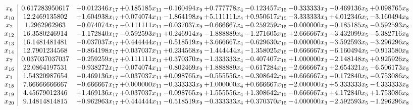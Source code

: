 \documentclass[10pt]{article}
\begin{document}
 \[\begin{array}{c| c c@{\hskip 2pt} c@{\hskip 2pt} c@{\hskip 2pt} c@{\hskip 2pt} c@{\hskip 2pt} c@{\hskip 2pt} c@{\hskip 2pt} c@{\hskip 2pt} }
 x_{6}   &  0.617283950617 & + 0.012346 x_{17} & + 0.185185 x_{11} & -0.160494 x_{9} & + 0.777778 x_{4} & -0.123457 x_{15} & -0.333333 x_{3} & -0.469136 x_{5} & + 0.098765 x_{8}\\
 x_{10}   &  12.2469135802 & + 1.604938 x_{17} & + 0.074074 x_{11} & -1.864198 x_{9} & + 5.111111 x_{4} & + 0.950617 x_{15} & -3.333333 x_{3} & + 4.012346 x_{5} & -3.160494 x_{8}\\
 x_{2}   &  1.2962962963 & -0.074074 x_{17} & -0.111111 x_{11} & -0.037037 x_{9} & -0.666667 x_{4} & -0.259259 x_{15} & -0.000000 x_{3} & -0.185185 x_{5} & -0.592593 x_{8}\\
 x_{12}   &  16.3580246914 & -1.172840 x_{17} & -0.592593 x_{11} & + 0.246914 x_{9} & -1.888889 x_{4} & -1.271605 x_{15} & + 2.666667 x_{3} & -3.432099 x_{5} & -5.382716 x_{8}\\
 x_{13}   &  16.1481481481 & -0.037037 x_{17} & + 0.444444 x_{11} & -0.518519 x_{9} & + 3.666667 x_{4} & -0.629630 x_{15} & -0.000000 x_{3} & -3.592593 x_{5} & -3.296296 x_{8}\\
 x_{14}   &  12.7901234568 & -0.864198 x_{17} & + 0.037037 x_{11} & + 0.234568 x_{9} & -1.444444 x_{4} & -1.358025 x_{15} & -0.666667 x_{3} & -6.160494 x_{5} & -0.913580 x_{8}\\
 x_{7}   &  0.037037037037 & -0.259259 x_{17} & + 0.111111 x_{11} & + 0.370370 x_{9} & -1.333333 x_{4} & -0.407407 x_{15} & + 1.000000 x_{3} & -2.148148 x_{5} & + 0.925926 x_{8}\\
 x_{16}   &  22.0864197531 & -0.938272 x_{17} & -0.074074 x_{11} & -0.802469 x_{9} & + 1.888889 x_{4} & -0.617284 x_{15} & -2.666667 x_{3} & + 2.654321 x_{5} & -6.506173 x_{8}\\
 x_{1}   &  1.54320987654 & -0.469136 x_{17} & -0.037037 x_{11} & + 0.098765 x_{9} & -0.555556 x_{4} & -0.308642 x_{15} & + 0.666667 x_{3} & -0.172840 x_{5} & -0.753086 x_{8}\\
 x_{18}   &  7.66666666667 & -0.666667 x_{17} & + 0.000000 x_{11} & -0.333333 x_{9} & + 1.000000 x_{4} & + 0.666667 x_{15} & -2.000000 x_{3} & + 5.333333 x_{5} & -4.333333 x_{8}\\
 x_{19}   &  4.45679012346 & + 1.469136 x_{17} & + 0.037037 x_{11} & -0.098765 x_{9} & + 1.555556 x_{4} & + 1.308642 x_{15} & -0.666667 x_{3} & + 4.172840 x_{5} & + 1.753086 x_{8}\\
 x_{20}   &  9.14814814815 & + 0.962963 x_{17} & + 0.444444 x_{11} & -0.518519 x_{9} & -0.333333 x_{4} & + 0.370370 x_{15} & -4.000000 x_{3} & -2.592593 x_{5} & -1.296296 x_{8}\\

\end{array}\]
\end{document}
